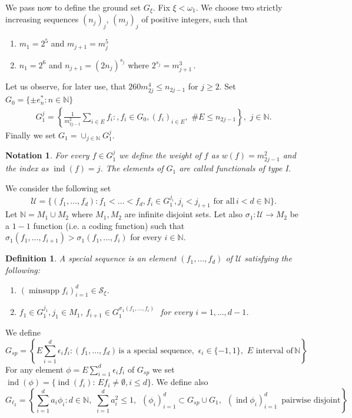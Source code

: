 \documentclass[a4paper]{amsart}
\theoremstyle{plain}
\newtheorem{definition}[theorem]{Definition}
\newtheorem{notation}[theorem]{Notation}
\newcommand{\N}{\mathbb{N}}
\newcommand{\mc}{\mathcal}
\newcommand{\e}{\epsilon}
\DeclareMathOperator{\minsupp}{minsupp}
\DeclareMathOperator{\ind}{ind}
\begin{document}
We pass now  to define the ground set $G_{\xi}$.
Fix $\xi<\omega_{1}$. We choose two strictly increasing sequences  $(n_{j})_{j}$,
$(m_{j})_{j}$ of positive integers, such that
\begin{enumerate}
\item[(i)]
$m_{1}=2^{5}$  and  $m_{j+1}= m_{j}^{5}$
\item [(ii)]
$n_{1}=2^{6}$  and $n_{j+1}=(2n_{j})^{s_{j}}$ where
$2^{s_{j}}=m_{j+1}^{3}$\,.
\end{enumerate}
Let us observe, for later use,
that $260m_{2j}^{4}\leq n_{2j-1}$ for  $j\geq 2$.
Set $G_{0}=\{\pm e^{*}_{n}: n\in\N\}$
\begin{align*}
G_{1}^{j}=\left\{\frac{1}{m^2_{2j-1}}\sum_{i\in E}f_{i}:,
f_{i}\in G_{0}, (f_{i})_{i\in E},\,\,\# E\leq n_{2j-1}\right\},\,\,
j\in \N.
\end{align*}
Finally we set $G_{1}=\cup_{j\in\N}G_{1}^{j}$.
\begin{notation}
For every  $f\in G_{1}^{j}$ we define  the weight of $f$ as $w(f)=m^2_{2j-1}$
 and  the index as $\ind(f)=j$.
The elements of $G_1$ are called functionals of type I.
 \end{notation}
We consider the following set
$$
\mathcal{U}=\{(f_{1},\dots,f_{d}): f_{1}<\dots<f_{d}, f_{i}\in
G_{1}^{j_i}, j_{i}<j_{i+1}\,\,\textrm{for all}\, i<
d\in\N\}.
$$
Let  $\N=M_{1}\cup M_{2}$ where  $M_{1},M_{2}$ are infinite disjoint sets. Let
also $ \sigma_{1}:\mathcal{U}\to M_{2} $
be a $1-1$ function (i.e. a coding function) such that
$\sigma_{1}(f_{1},\dots,f_{i+1})>\sigma_{1} (f_{1},\dots,f_{i})$ for every $i\in\N$.
\begin{definition}\label{dee1}
A special sequence  is an element
$(f_{1},\dots,f_{d})$ of $\mathcal{U}$ satisfying the following:
\begin{enumerate}
\item[1)] $(\minsupp f_{i})_{i=1}^{d}\in\mc{S}_{\xi}$. \item[2)]
$f_{1}\in G_{1}^{j_1}, j_{1}\in M_{1}$,
$f_{i+1}\in G_{1}^{\sigma_{1}(f_{1},\dots,f_{i})}$\,\, for every
$i=1,\dots,d-1$.
\end{enumerate}
\end{definition}
We define
$$
G_{sp}=\left\{E\sum_{i=1}^{d}\e_{i}f_{i}:
(f_{1},\dots,f_{d})\, \textrm{is a special
sequence},\,\,\e_{i}\in\{-1,1\},\,\, E\,\,\textrm{interval
of}\,\N\right\}
$$
For any element
$\phi=E\sum_{i=1}^{d}\e_{i}f_{i}$ of $G_{sp}$ we set
$\ind(\phi)=\{\ind
(f_i):\, Ef_i\neq \emptyset, i\leq d\}$. We define also
$$
G_{\ell_2}=\left\{\sum_{i=1}^{d}a_i\phi_{i}:d\in\N,\,\,\sum_{i=1}^{d}a_{i}^{2}\leq
1,\,\,\,(\phi_{i})_{i=1}^{d}\subset G_{sp}\cup G_1,\,\,\,
(\ind\phi_i)_{i=1}^d\,\,\,\textrm{pairwise disjoint}\right\}.
$$
\end{document}
